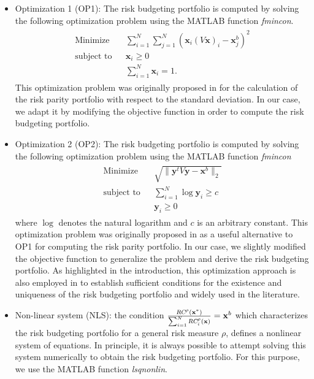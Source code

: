 \documentclass[preprint,11pt,authoryear]{elsarticle}
\begin{document}
\begin{itemize}
	\item Optimization 1 (OP1): The risk budgeting portfolio is computed by solving the following optimization problem using the MATLAB function \textsl{fmincon}.
	\begin{eqnarray*}
\begin{array}{lll}
\textrm{Minimize} && \sum_{i = 1}^N \sum_{j = 1}^N \left(\mathbf{x}_i (V\mathbf{x})_i - \mathbf{x}^b_j  \right)^2\\
\textrm{subject to} && \mathbf{x}_i \geq 0\\
&& \sum_{i = 1}^N \mathbf{x}_i = 1. 
\end{array}
\end{eqnarray*}
This optimization problem was originally proposed in \cite{maillard2010properties} for the calculation of the risk parity portfolio with respect to the standard deviation. In our case, we adapt it by modifying the objective function in order to compute the risk budgeting portfolio.

	
	\item Optimization 2 (OP2): The risk budgeting portfolio is computed by solving the following optimization problem using the MATLAB function \textsl{fmincon}
	\begin{eqnarray*}
\begin{array}{lll}
\textrm{Minimize} && \sqrt{\|\mathbf{y}^t V \mathbf{y} - \mathbf{x}^b \|_2}\\
\textrm{subject to} && \sum_{i = 1}^N \log{\mathbf{y}_i} \geq c\\
&& \mathbf{y}_i \geq 0 
\end{array}
\end{eqnarray*}
where $\log$ denotes the natural logarithm and $c$ is an arbitrary constant. This optimization problem was originally proposed in \cite{maillard2010properties} as a useful alternative to OP1 for computing the risk parity portfolio. In our case, we slightly modified the objective function to generalize the problem and derive the risk budgeting portfolio. As highlighted in the introduction, this optimization approach is also employed in \cite{cetingoz2024risk} to establish sufficient conditions for the existence and uniqueness of the risk budgeting portfolio and widely used in the literature.

  \item Non-linear system (NLS): the condition $\frac{\textsl{RC}^{\rho}(\mathbf{x}^*)}{\sum_{i = 1}^N \textsl{RC}^{\rho}_i(\mathbf{x})} = \mathbf{x}^b$ which characterizes the risk budgeting portfolio for a general risk measure $\rho$, defines a nonlinear system of equations. In principle, it is always possible to attempt solving this system numerically to obtain the risk budgeting portfolio. For this purpose, we use the MATLAB function \textsl{lsqnonlin}.
\end{itemize}
\end{document}
